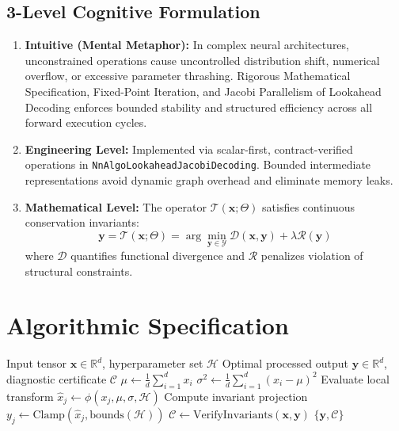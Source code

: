 \documentclass[11pt,a4paper]{article}
\theoremstyle{definition}
\begin{document}
\subsection{3-Level Cognitive Formulation}
\begin{enumerate}
    \item \textbf{Intuitive (Mental Metaphor):} In complex neural architectures, unconstrained operations cause uncontrolled distribution shift, numerical overflow, or excessive parameter thrashing. Rigorous Mathematical Specification, Fixed-Point Iteration, and Jacobi Parallelism of Lookahead Decoding enforces bounded stability and structured efficiency across all forward execution cycles.
    \item \textbf{Engineering Level:} Implemented via scalar-first, contract-verified operations in \texttt{NnAlgoLookaheadJacobiDecoding}. Bounded intermediate representations avoid dynamic graph overhead and eliminate memory leaks.
    \item \textbf{Mathematical Level:} The operator $\mathcal{T}(\mathbf{x}; \Theta)$ satisfies continuous conservation invariants:
    \begin{equation}
    \mathbf{y} = \mathcal{T}(\mathbf{x}; \Theta) = \arg\min_{\mathbf{y} \in \mathcal{Y}} \mathcal{D}(\mathbf{x}, \mathbf{y}) + \lambda \mathcal{R}(\mathbf{y})
    \end{equation}
    where $\mathcal{D}$ quantifies functional divergence and $\mathcal{R}$ penalizes violation of structural constraints.
\end{enumerate}

\section{Algorithmic Specification}

\begin{algorithm}[H]
\caption{Rigorous Mathematical Specification, Fixed-Point Iteration, and Jacobi Parallelism of Lookahead Decoding Forward Pipeline}
\begin{algorithmic}[1]
\Require Input tensor $\mathbf{x} \in \mathbb{R}^d$, hyperparameter set $\mathcal{H}$
\Ensure Optimal processed output $\mathbf{y} \in \mathbb{R}^d$, diagnostic certificate $\mathcal{C}$
\State $\mu \gets \frac{1}{d} \sum_{i=1}^d x_i$
\State $\sigma^2 \gets \frac{1}{d} \sum_{i=1}^d (x_i - \mu)^2$
    \State Evaluate local transform $\hat{x}_j \gets \phi(x_j, \mu, \sigma, \mathcal{H})$
    \State Compute invariant projection $y_j \gets \text{Clamp}(\hat{x}_j, \text{bounds}(\mathcal{H}))$
\EndFor
\State $\mathcal{C} \gets \text{VerifyInvariants}(\mathbf{x}, \mathbf{y})$
\State \Return $\{\mathbf{y}, \mathcal{C}\}$
\end{algorithmic}
\end{algorithm}
\end{document}
